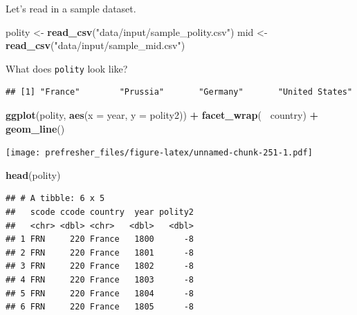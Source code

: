 \documentclass[]{book}
\newenvironment{Shaded}{\begin{snugshade}}{\end{snugshade}}
\newcommand{\KeywordTok}[1]{\textcolor[rgb]{0.13,0.29,0.53}{\textbf{#1}}}
\newcommand{\DataTypeTok}[1]{\textcolor[rgb]{0.13,0.29,0.53}{#1}}
\newcommand{\StringTok}[1]{\textcolor[rgb]{0.31,0.60,0.02}{#1}}
\newcommand{\OperatorTok}[1]{\textcolor[rgb]{0.81,0.36,0.00}{\textbf{#1}}}
\newcommand{\NormalTok}[1]{#1}
\theoremstyle{definition}
\theoremstyle{definition}
\theoremstyle{definition}
\theoremstyle{remark}
\begin{document}
Let's read in a sample dataset.

\begin{Shaded}
\begin{Highlighting}[]
\NormalTok{polity <-}\StringTok{ }\KeywordTok{read_csv}\NormalTok{(}\StringTok{"data/input/sample_polity.csv"}\NormalTok{)}
\NormalTok{mid <-}\StringTok{ }\KeywordTok{read_csv}\NormalTok{(}\StringTok{"data/input/sample_mid.csv"}\NormalTok{)}
\end{Highlighting}
\end{Shaded}

What does \texttt{polity} look like?

\begin{Shaded}
\end{Shaded}

\begin{verbatim}
## [1] "France"        "Prussia"       "Germany"       "United States"
\end{verbatim}

\begin{Shaded}
\begin{Highlighting}[]
\KeywordTok{ggplot}\NormalTok{(polity, }\KeywordTok{aes}\NormalTok{(}\DataTypeTok{x =}\NormalTok{ year, }\DataTypeTok{y =}\NormalTok{ polity2)) }\OperatorTok{+}
\StringTok{  }\KeywordTok{facet_wrap}\NormalTok{(}\OperatorTok{~}\StringTok{ }\NormalTok{country) }\OperatorTok{+}
\StringTok{  }\KeywordTok{geom_line}\NormalTok{()}
\end{Highlighting}
\end{Shaded}

\texttt{[image: prefresher\_files/figure-latex/unnamed-chunk-251-1.pdf]}

\begin{Shaded}
\begin{Highlighting}[]
\KeywordTok{head}\NormalTok{(polity)}
\end{Highlighting}
\end{Shaded}

\begin{verbatim}
## # A tibble: 6 x 5
##   scode ccode country  year polity2
##   <chr> <dbl> <chr>   <dbl>   <dbl>
## 1 FRN     220 France   1800      -8
## 2 FRN     220 France   1801      -8
## 3 FRN     220 France   1802      -8
## 4 FRN     220 France   1803      -8
## 5 FRN     220 France   1804      -8
## 6 FRN     220 France   1805      -8
\end{verbatim}
\end{document}
